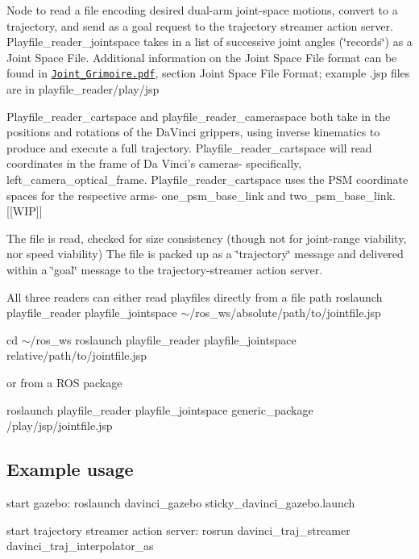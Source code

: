 Node to read a file encoding desired dual-\/arm joint-\/space motions, convert to a trajectory, and send as a goal request to the trajectory streamer action server. Playfile\-\_\-reader\-\_\-jointspace takes in a list of successive joint angles (\char`\"{}records\char`\"{}) as a Joint Space File. Additional information on the Joint Space File format can be found in \href{Joint_Grimoire.pdf}{\tt Joint\-\_\-\-Grimoire.\-pdf}, section Joint Space File Format; example .jsp files are in playfile\-\_\-reader/play/jsp

Playfile\-\_\-reader\-\_\-cartspace and playfile\-\_\-reader\-\_\-cameraspace both take in the positions and rotations of the Da\-Vinci grippers, using inverse kinematics to produce and execute a full trajectory. Playfile\-\_\-reader\-\_\-cartspace will read coordinates in the frame of Da Vinci's cameras-\/ specifically, left\-\_\-camera\-\_\-optical\-\_\-frame. Playfile\-\_\-reader\-\_\-cartspace uses the P\-S\-M coordinate spaces for the respective arms-\/ one\-\_\-psm\-\_\-base\-\_\-link and two\-\_\-psm\-\_\-base\-\_\-link. \mbox{[}\mbox{[}W\-I\-P\mbox{]}\mbox{]}

The file is read, checked for size consistency (though not for joint-\/range viability, nor speed viability) The file is packed up as a \char`\"{}trajectory\char`\"{} message and delivered within a \char`\"{}goal\char`\"{} message to the trajectory-\/streamer action server.

All three readers can either read playfiles directly from a file path {\ttfamily roslaunch playfile\-\_\-reader playfile\-\_\-jointspace $\sim$/ros\-\_\-ws/absolute/path/to/jointfile.jsp}

{\ttfamily cd $\sim$/ros\-\_\-ws roslaunch playfile\-\_\-reader playfile\-\_\-jointspace relative/path/to/jointfile.\-jsp}

or from a R\-O\-S package

{\ttfamily roslaunch playfile\-\_\-reader playfile\-\_\-jointspace generic\-\_\-package /play/jsp/jointfile.jsp}

\subsection*{Example usage}

start gazebo\-: {\ttfamily roslaunch davinci\-\_\-gazebo sticky\-\_\-davinci\-\_\-gazebo.\-launch}

start trajectory streamer action server\-: {\ttfamily rosrun davinci\-\_\-traj\-\_\-streamer davinci\-\_\-traj\-\_\-interpolator\-\_\-as}

